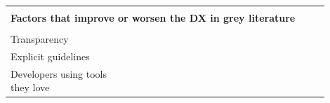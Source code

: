 \documentclass[english, 12pt, a4paper, sci, utf8, a-1b, online]{aaltothesis}
\begin{document}
{\begin{center}
\begin{longtable}{p{0.3\linewidth}p{0.6\linewidth}}
      &                                                                                                                                                                                                                                                                                                                              \\
      \multicolumn{2}{l}{\textbf{Factors that improve or worsen the DX in grey literature}}                                                                                                                                                                                                                                                                                                                                               \\
      \hline                                                                                                                                                                                                                                                                                                                                                                 \\
      Transparency                            & \textcite{workflows-for-the-new-developer-experience} \newline \textcite{4-apis-doing-developer-experience-really-well} \newline \textcite{dx-devs-are-people-too}                                                                                                                                                           \\
      Explicit guidelines                     & \textcite{the-best-practices-for-a-great-dx} \newline \textcite{what-exactly-is-developer-experience}                                                                                                                                                                                                                        \\
      Developers using tools they love        & \textcite{heroku-dx} \newline \textcite{great-dx-and-the-people-who-make-them} \newline \textcite{how-i-missed-it-before} \newline \textcite{building-the-developer-experience-from-the-ground-up} \newline \textcite{what-is-api-developer-experience-and-why-it-matters}                                                   \\

\end{longtable}
\end{center}}
\end{document}
